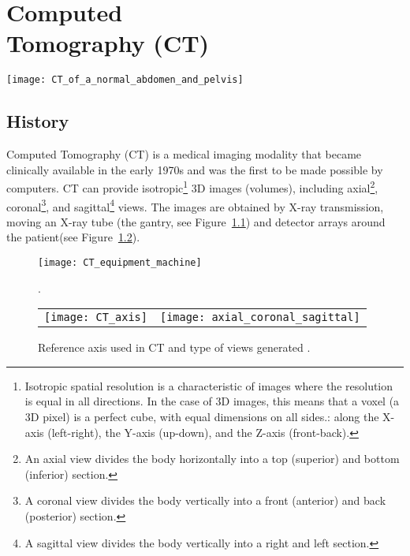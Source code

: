 \chapter{Computed\\Tomography (CT)}
\vspace{-43ex}
\begin{flushright}
\texttt{[image: CT\_of\_a\_normal\_abdomen\_and\_pelvis]} %
\end{flushright}

\section{History}
Computed Tomography (CT) is a medical imaging modality that became
clinically available in the early 1970s and was the first to be made
possible by computers. CT can provide isotropic\footnote{Isotropic
  spatial resolution is a characteristic of images where the
  resolution is equal in all directions. In the case of 3D images,
  this means that a voxel (a 3D pixel) is a perfect cube, with equal
  dimensions on all sides.: along the X-axis (left-right), the Y-axis
  (up-down), and the Z-axis (front-back). } 3D images (volumes),
including axial\footnote{An axial view divides the body horizontally
  into a top (superior) and bottom (inferior) section.},
coronal\footnote{A coronal view divides the body vertically into a
  front (anterior) and back (posterior) section.}, and
sagittal\footnote{A sagittal view divides the body vertically into a
  right and left section.} views. The images are obtained by X-ray
transmission, moving an X-ray tube (the gantry, see
Figure~\ref{fig:CT_equipment_machine}) and detector arrays around the
patient(see Figure~\ref{fig:views_in_CT}).

\begin{figure}
  \centering
    \texttt{[image: CT\_equipment\_machine]}
  \caption{ \cite{morin2025radiation}.\label{fig:CT_equipment_machine}}
\end{figure}

\begin{figure}
  \centering
  \begin{tabular}{cc}
    \texttt{[image: CT\_axis]} & \texttt{[image: axial\_coronal\_sagittal]}
  \end{tabular}
  \caption{Reference axis used in CT and type of views generated \cite{morin2025radiation}.\label{fig:views_in_CT}}
\end{figure}

